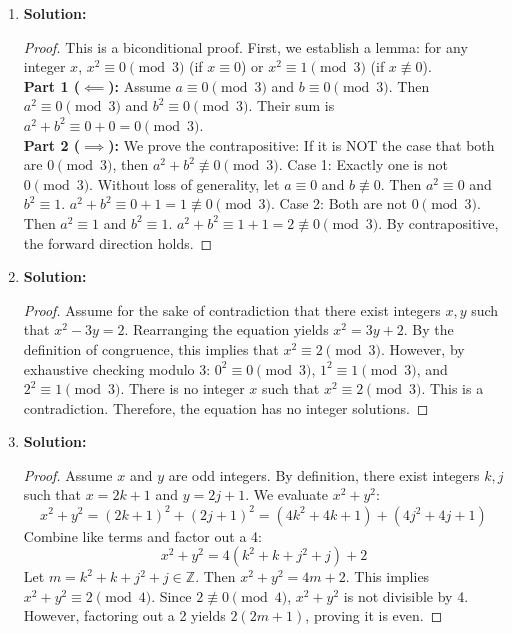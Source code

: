 \documentclass{article}
\begin{document}
\begin{enumerate}
    \item \textbf{Solution:}
    \begin{proof}
        This is a biconditional proof. First, we establish a lemma: for any integer $x$, $x^2 \equiv 0 \pmod 3$ (if $x \equiv 0$) or $x^2 \equiv 1 \pmod 3$ (if $x \not\equiv 0$). \\
        \textbf{Part 1 ($\impliedby$):} Assume $a \equiv 0 \pmod 3$ and $b \equiv 0 \pmod 3$. Then $a^2 \equiv 0 \pmod 3$ and $b^2 \equiv 0 \pmod 3$. Their sum is $a^2 + b^2 \equiv 0 + 0 = 0 \pmod 3$. \\
        \textbf{Part 2 ($\implies$):} We prove the contrapositive: If it is NOT the case that both are $0 \pmod 3$, then $a^2 + b^2 \not\equiv 0 \pmod 3$. 
        Case 1: Exactly one is not $0 \pmod 3$. Without loss of generality, let $a \equiv 0$ and $b \not\equiv 0$. Then $a^2 \equiv 0$ and $b^2 \equiv 1$. $a^2 + b^2 \equiv 0 + 1 = 1 \not\equiv 0 \pmod 3$.
        Case 2: Both are not $0 \pmod 3$. Then $a^2 \equiv 1$ and $b^2 \equiv 1$. $a^2 + b^2 \equiv 1 + 1 = 2 \not\equiv 0 \pmod 3$.
        By contrapositive, the forward direction holds.
    \end{proof}

    \item \textbf{Solution:}
    \begin{proof}
        Assume for the sake of contradiction that there exist integers $x, y$ such that $x^2 - 3y = 2$. Rearranging the equation yields $x^2 = 3y + 2$. By the definition of congruence, this implies that $x^2 \equiv 2 \pmod 3$. However, by exhaustive checking modulo 3:
        $0^2 \equiv 0 \pmod 3$, $1^2 \equiv 1 \pmod 3$, and $2^2 \equiv 1 \pmod 3$.
        There is no integer $x$ such that $x^2 \equiv 2 \pmod 3$. This is a contradiction. Therefore, the equation has no integer solutions.
    \end{proof}

    \item \textbf{Solution:}
    \begin{proof}
        Assume $x$ and $y$ are odd integers. By definition, there exist integers $k, j$ such that $x = 2k + 1$ and $y = 2j + 1$. We evaluate $x^2 + y^2$:
        \[ x^2 + y^2 = (2k + 1)^2 + (2j + 1)^2 = (4k^2 + 4k + 1) + (4j^2 + 4j + 1) \]
        Combine like terms and factor out a 4:
        \[ x^2 + y^2 = 4(k^2 + k + j^2 + j) + 2 \]
        Let $m = k^2 + k + j^2 + j \in \mathbb{Z}$. Then $x^2 + y^2 = 4m + 2$. This implies $x^2 + y^2 \equiv 2 \pmod 4$. Since $2 \not\equiv 0 \pmod 4$, $x^2 + y^2$ is not divisible by 4. However, factoring out a 2 yields $2(2m + 1)$, proving it is even.
    \end{proof}


\end{enumerate}
\end{document}
